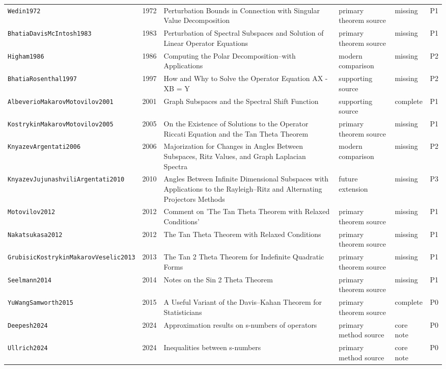 \documentclass[10pt]{article}
\newcommand{\code}[1]{\texttt{#1}}
\begin{document}
\begin{longtable}{@{}p{}p{}p{}p{}p{}p{}@{}}
\code{Wedin1972} & 1972 & Perturbation Bounds in Connection with Singular Value Decomposition & primary theorem source & missing & P1 \\
\code{BhatiaDavisMcIntosh1983} & 1983 & Perturbation of Spectral Subspaces and Solution of Linear Operator Equations & primary theorem source & missing & P1 \\
\code{Higham1986} & 1986 & Computing the Polar Decomposition--with Applications & modern comparison & missing & P2 \\
\code{BhatiaRosenthal1997} & 1997 & How and Why to Solve the Operator Equation AX - XB = Y & supporting source & missing & P2 \\
\code{AlbeverioMakarovMotovilov2001} & 2001 & Graph Subspaces and the Spectral Shift Function & supporting source & complete & P1 \\
\code{KostrykinMakarovMotovilov2005} & 2005 & On the Existence of Solutions to the Operator Riccati Equation and the Tan Theta Theorem & primary theorem source & missing & P1 \\
\code{KnyazevArgentati2006} & 2006 & Majorization for Changes in Angles Between Subspaces, Ritz Values, and Graph Laplacian Spectra & modern comparison & missing & P2 \\
\code{KnyazevJujunashviliArgentati2010} & 2010 & Angles Between Infinite Dimensional Subspaces with Applications to the Rayleigh--Ritz and Alternating Projectors Methods & future extension & missing & P3 \\
\code{Motovilov2012} & 2012 & Comment on 'The Tan Theta Theorem with Relaxed Conditions' & primary theorem source & missing & P1 \\
\code{Nakatsukasa2012} & 2012 & The Tan Theta Theorem with Relaxed Conditions & primary theorem source & missing & P1 \\
\code{GrubisicKostrykinMakarovVeselic2013} & 2013 & The Tan 2 Theta Theorem for Indefinite Quadratic Forms & primary theorem source & missing & P1 \\
\code{Seelmann2014} & 2014 & Notes on the Sin 2 Theta Theorem & primary theorem source & missing & P1 \\
\code{YuWangSamworth2015} & 2015 & A Useful Variant of the Davis--Kahan Theorem for Statisticians & primary theorem source & complete & P0 \\
\code{Deepesh2024} & 2024 & Approximation results on s-numbers of operators & primary method source & core note & P0 \\
\code{Ullrich2024} & 2024 & Inequalities between s-numbers & primary method source & core note & P0 \\
\bottomrule
\end{longtable}
\end{document}
